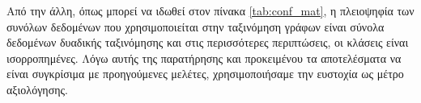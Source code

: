 \begin{table}[]
\centering
{}
\caption{Πίνακας σύγχυσης για ένα πρόβλημα δυαδικής ταξινόμησης.}
\label{tab:conf_mat}
\end{table}
Από την άλλη, όπως μπορεί να ιδωθεί στον πίνακα \ref{tab:conf_mat}, η πλειοψηφία των συνόλων δεδομένων που χρησιμοποιείται στην ταξινόμηση γράφων είναι σύνολα δεδομένων δυαδικής ταξινόμησης και στις περισσότερες περιπτώσεις, οι κλάσεις είναι ισορροπημένες.
Λόγω αυτής της παρατήρησης και προκειμένου τα αποτελέσματα να είναι συγκρίσιμα με προηγούμενες μελέτες, χρησιμοποιήσαμε την ευστοχία ως μέτρο αξιολόγησης.


